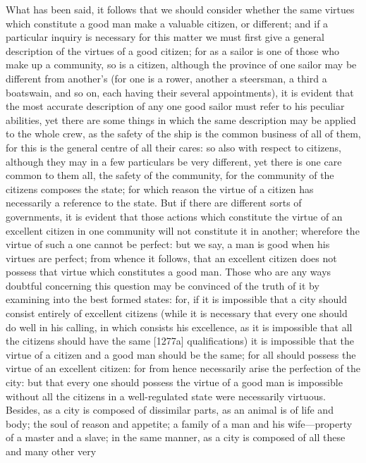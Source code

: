 
What has been said, it follows that we should consider whether the same
virtues which constitute a good man make a valuable citizen, or different;
and if a particular inquiry is necessary for this matter we must first
give a general description of the virtues of a good citizen; for as a
sailor is one of those who make up a community, so is a citizen, although
the province of one sailor may be different from another's (for one is a
rower, another a steersman, a third a boatswain, and so on, each having
their several appointments), it is evident that the most accurate
description of any one good sailor must refer to his peculiar abilities,
yet there are some things in which the same description may be applied to
the whole crew, as the safety of the ship is the common business of all of
them, for this is the general centre of all their cares: so also with
respect to citizens, although they may in a few particulars be very
different, yet there is one care common to them all, the safety of the
community, for the community of the citizens composes the state; for which
reason the virtue of a citizen has necessarily a reference to the state.
But if there are different sorts of governments, it is evident that those
actions which constitute the virtue of an excellent citizen in one
community will not constitute it in another; wherefore the virtue of such
a one cannot be perfect: but we say, a man is good when his virtues are
perfect; from whence it follows, that an excellent citizen does not
possess that virtue which constitutes a good man. Those who are any ways
doubtful concerning this question may be convinced of the truth of it by
examining into the best formed states: for, if it is impossible that a
city should consist entirely of excellent citizens (while it is necessary
that every one should do well in his calling, in which consists his
excellence, as it is impossible that all the citizens should have the same
[1277a] qualifications) it is impossible that the virtue of a citizen and
a good man should be the same; for all should possess the virtue of an
excellent citizen: for from hence necessarily arise the perfection of the
city: but that every one should possess the virtue of a good man is
impossible without all the citizens in a well-regulated state were
necessarily virtuous. Besides, as a city is composed of dissimilar parts,
as an animal is of life and body; the soul of reason and appetite; a
family of a man and his wife—property of a master and a slave; in
the same manner, as a city is composed of all these and many other very
